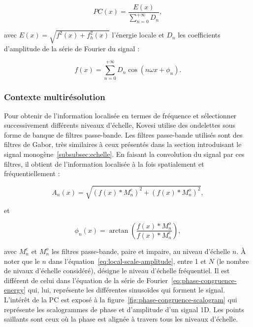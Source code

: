 \begin{equation}
    PC(x) = \frac{E(x)}{\sum_{n=0}^{+\infty} D_n},
\end{equation}

avec $E(x) = \sqrt{f^2(x) + f_h^2(x)}$ l'énergie locale et $D_n$ les coefficients d'amplitude de la série de Fourier du signal :

\begin{equation}
    f(x) = \sum_{n=0}^{+\infty} D_n\cos(n\omega x + \phi_n).
    \label{eq:phase-congruence-energy}
\end{equation}


\subsubsection{Contexte multirésolution}

Pour obtenir de l'information localisée en termes de fréquence et sélectionner successivement différents niveaux d'échelle, Kovesi utilise des ondelettes sous forme de banque de filtres passe-bande. Les filtres passe-bande utilisés sont des filtres de Gabor, très similaires à ceux présentés dans la section introduisant le signal monogène~\ref{subsubsec:echelle}. En faisant la convolution du signal par ces filtres, il obtient de l'information localisée à la fois spatialement et fréquentiellement :

\begin{equation}
    A_n(x) = \sqrt{(f(x)*M^e_n)^2 + (f(x)*M^o_n)^2},
    \label{eq:local-scale-amplitude}
\end{equation}

et

\begin{equation}
    \phi_n(x) = \arctan\left(\frac{f(x)*M^o_n}{f(x)*M^e_n}\right),
\end{equation}

avec $M^e_n$ et $M^o_n$ les filtres passe-bande, paire et impaire, au niveau d'échelle $n$. À noter que le $n$ dans l'équation~\ref{eq:local-scale-amplitude}, entre 1 et $N$ (le nombre de nivaux d'échelle considéré), désigne le niveau d'échelle fréquentiel. Il est différent de celui dans l'équation de la série de Fourier~\ref{eq:phase-congruence-energy} qui, lui, représente les différentes sinusoïdes qui forment le signal. L'intérêt de la PC est exposé à la figure~\ref{fig:phase-congruence-scalogram} qui représente les scalogrammes de phase et d'amplitude d'un signal 1D. Les points saillants sont ceux où la phase est alignée à travers tous les niveaux d'échelle.

